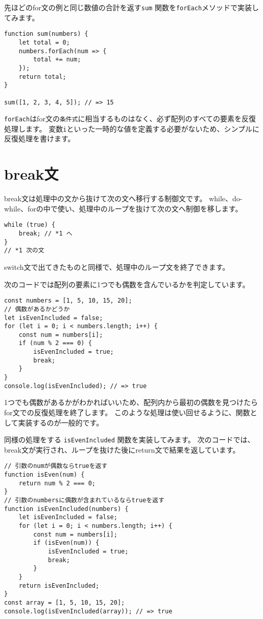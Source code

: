 先ほどのfor文の例と同じ数値の合計を返す\texttt{sum}
関数を\texttt{forEach}メソッドで実装してみます。

\begin{lstlisting}
function sum(numbers) {
    let total = 0;
    numbers.forEach(num => {
        total += num;
    });
    return total;
}

sum([1, 2, 3, 4, 5]); // => 15
\end{lstlisting}

\texttt{forEach}はfor文の\texttt{条件式}に相当するものはなく、必ず配列のすべての要素を反復処理します。
変数\texttt{i}といった一時的な値を定義する必要がないため、シンプルに反復処理を書けます。

\hypertarget{break-statement}{%
\section{break文}\label{break-statement}}

break文は処理中の文から抜けて次の文へ移行する制御文です。
while、do-while、forの中で使い、処理中のループを抜けて次の文へ制御を移します。

\begin{lstlisting}
while (true) {
    break; // *1 へ
}
// *1 次の文
\end{lstlisting}

switch文で出てきたものと同様で、処理中のループ文を終了できます。

次のコードでは配列の要素に1つでも偶数を含んでいるかを判定しています。

\begin{lstlisting}
const numbers = [1, 5, 10, 15, 20];
// 偶数があるかどうか
let isEvenIncluded = false;
for (let i = 0; i < numbers.length; i++) {
    const num = numbers[i];
    if (num % 2 === 0) {
        isEvenIncluded = true;
        break;
    }
}
console.log(isEvenIncluded); // => true
\end{lstlisting}

1つでも偶数があるかがわかればいいため、配列内から最初の偶数を見つけたらfor文での反復処理を終了します。
このような処理は使い回せるように、関数として実装するのが一般的です。

同様の処理をする \texttt{isEvenIncluded}
関数を実装してみます。
次のコードでは、break文が実行され、ループを抜けた後にreturn文で結果を返しています。

\begin{lstlisting}
// 引数のnumが偶数ならtrueを返す
function isEven(num) {
    return num % 2 === 0;
}
// 引数のnumbersに偶数が含まれているならtrueを返す
function isEvenIncluded(numbers) {
    let isEvenIncluded = false;
    for (let i = 0; i < numbers.length; i++) {
        const num = numbers[i];
        if (isEven(num)) {
            isEvenIncluded = true;
            break;
        }
    }
    return isEvenIncluded;
}
const array = [1, 5, 10, 15, 20];
console.log(isEvenIncluded(array)); // => true
\end{lstlisting}

